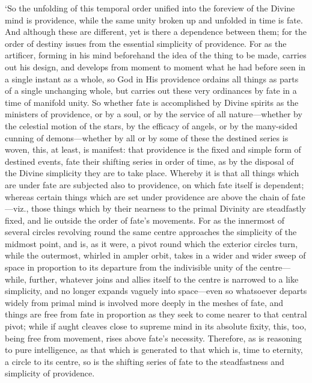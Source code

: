 \documentclass[12pt]{book}
\begin{document}
`So the unfolding of this temporal order unified into the foreview of
the Divine mind is providence, while the same unity broken up and
unfolded in time is fate. And although these are different, yet is there
a dependence between them; for the order of destiny issues from the
essential simplicity of providence. For as the artificer, forming in his
mind beforehand the idea of the thing to be made, carries out his
design, and develops from moment to moment what he had before seen in a
single instant as a whole, so God in His providence ordains all things
as parts of a single unchanging whole, but carries out these very
ordinances by fate in a time of manifold unity. So whether fate is
accomplished by Divine spirits as the ministers of providence, or by a
soul, or by the service of all nature---whether by the celestial motion
of the stars, by the efficacy of angels, or by the many-sided cunning of
demons---whether by all or by some of these the destined series is woven,
this, at least, is manifest: that providence is the fixed and simple
form of destined events, fate their shifting series in order of time, as
by the disposal of the Divine simplicity they are to take place. Whereby
it is that all things which are under fate are subjected also to
providence, on which fate itself is dependent; whereas certain things
which are set under providence are above the chain of fate---viz., those
things which by their nearness to the primal Divinity are steadfastly
fixed, and lie outside the order of fate's movements. For as the
innermost of several circles revolving round the same centre approaches
the simplicity of the midmost point, and is, as it were, a pivot round
which the exterior circles turn, while the outermost, whirled in ampler
orbit, takes in a wider and wider sweep of space in proportion to its
departure from the indivisible unity of the centre---while, further,
whatever joins and allies itself to the centre is narrowed to a like
simplicity, and no longer expands vaguely into space---even so whatsoever
departs widely from primal mind is involved more deeply in the meshes of
fate, and things are free from fate in proportion as they seek to come
nearer to that central pivot; while if aught cleaves close to supreme
mind in its absolute fixity, this, too, being free from movement, rises
above fate's necessity. Therefore, as is reasoning to pure intelligence,
as that which is generated to that which is, time to eternity, a circle
to its centre, so is the shifting series of fate to the steadfastness
and simplicity of providence.
\end{document}
